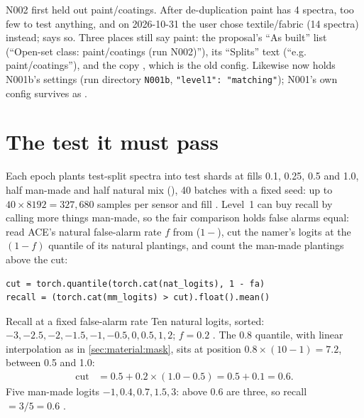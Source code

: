 \begin{sourcenote}
N002 first held out paint/coatings. After de-duplication paint has 4 spectra, too few to test anything, and on
2026-10-31 the user chose textile/fabric (14 spectra) instead;  says so. Three places
still say paint: the proposal's ``As built'' list (``Open-set class: paint/coatings (run N002)''), its ``Splits'' text
(``e.g. paint/coatings''), and the copy , which is the old
config. Likewise  now holds N001b's settings (run directory \texttt{N001b},
\texttt{"level1": "matching"}); N001's own config survives as
.
\end{sourcenote}

\section{The test it must pass}\label{sec:namer:pass}

Each epoch  plants test-split spectra into test shards at fills 0.1, 0.25, 0.5 and 1.0, half man-made
and half natural mix (), 40 batches with a fixed seed: up to $40\times8192=327{,}680$
samples per sensor and fill \tagC. Level~1 can buy recall by calling more things man-made, so the fair comparison holds
false alarms equal: read ACE's natural false-alarm rate $f$ from 
($1-$), cut the namer's logits at the $(1-f)$ quantile of its natural plantings, and
count the man-made plantings above the cut:
\begin{lstlisting}
cut = torch.quantile(torch.cat(nat_logits), 1 - fa)
recall = (torch.cat(mm_logits) > cut).float().mean()
\end{lstlisting}

\begin{worked}[label={we:namer:quantile}]{Recall at a fixed false-alarm rate}
Ten natural logits, sorted: $-3,-2.5,-2,-1.5,-1,-0.5,0,0.5,1,2$; $f=0.2$ \tagA. The 0.8 quantile, with linear
interpolation as in \cref{sec:material:mask}, sits at position $0.8\times(10-1)=7.2$, between 0.5 and 1.0:
\begin{align*}
\text{cut} &= 0.5+0.2\times(1.0-0.5) = 0.5+0.1 = 0.6 .
\end{align*}
Five man-made logits $-1, 0.4, 0.7, 1.5, 3$: above 0.6 are three, so recall $=3/5=0.6$ \tagC.
\end{worked}

